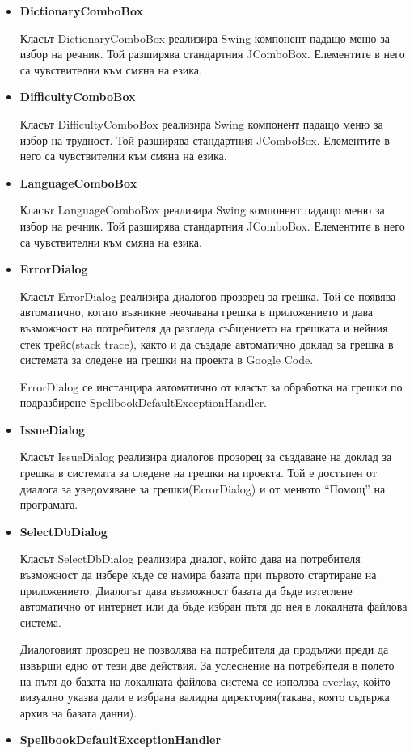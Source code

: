 \begin{itemize}
  \item \textbf{DictionaryComboBox}

    Класът DictionaryComboBox реализира Swing компонент падащо меню за
    избор на речник. Той разширява стандартния JComboBox. Елементите в
    него са чувствителни към смяна на езика.
  \item \textbf{DifficultyComboBox}

    Класът DifficultyComboBox реализира Swing компонент падащо меню за
    избор на трудност. Той разширява стандартния JComboBox. Елементите в
    него са чувствителни към смяна на езика.
  \item \textbf{LanguageComboBox}

    Класът LanguageComboBox реализира Swing компонент падащо меню за
    избор на речник. Той разширява стандартния JComboBox. Елементите в
    него са чувствителни към смяна на езика.
  \item \textbf{ErrorDialog}

    Класът ErrorDialog реализира диалогов прозорец за грешка. Той се
    появява автоматично, когато възникне неочавана грешка в
    приложението и дава възможност на потребителя да разгледа
    събщението на грешката и нейния стек трейс(stack trace), както и
    да създаде автоматично доклад за грешка в системата за следене на
    грешки на проекта в Google Code.

    ErrorDialog се инстанцира автоматично от класът за обработка на
    грешки по подразбирене SpellbookDefaultExceptionHandler. 
  \item \textbf{IssueDialog}

    Класът IssueDialog реализира диалогов прозорец за създаване на
    доклад за грешка в системата за следене на грешки на проекта. Той
    е достъпен от диалога за уведомяване за грешки(ErrorDialog) и от
    менюто "`Помощ"' на програмата. 
  \item \textbf{SelectDbDialog}

    Класът SelectDbDialog реализира диалог, който дава на потребителя
    възможност да избере къде се намира базата при първото стартиране
    на приложението. Диалогът дава възможност базата да бъде изтеглене
    автоматично от интернет или да бъде избран пътя до нея в локалната
    файлова система.

    Диалоговият прозорец не позволява на потребителя да продължи преди
    да извърши едно от тези две действия. За услеснение на потребителя
    в полето на пътя до базата на локалната файлова система се
    използва overlay, който визуално указва дали е избрана валидна
    директория(такава, която съдържа архив на базата данни).
  \item \textbf{SpellbookDefaultExceptionHandler}


\end{itemize}
